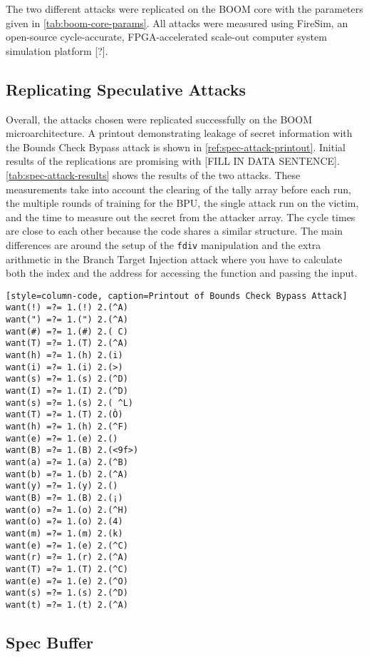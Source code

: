 The two different attacks were replicated on the BOOM core with the parameters given
in \ref{tab:boom-core-params}. All attacks were measured using FireSim, an open-source
cycle-accurate, FPGA-accelerated scale-out computer system simulation platform [?].

\subsection{Replicating Speculative Attacks}

Overall, the attacks chosen were replicated successfully on the BOOM microarchitecture. A printout
demonstrating leakage of secret information with the Bounds Check Bypass attack
is shown in \ref{ref:spec-attack-printout}. Initial results of the replications
are promising with [FILL IN DATA SENTENCE]. \ref{tab:spec-attack-results}
shows the results of the two attacks. These measurements take into account the clearing
of the tally array before each run, the multiple rounds of training for the BPU,
the single attack run on the victim, and the time to measure out the secret from the attacker array.
The cycle times are close to each other because the code shares a similar structure. The main
differences are around the setup of the {\tt fdiv} manipulation
and the extra arithmetic in the Branch Target Injection attack where you have to calculate
both the index and the address for accessing the function and passing the input. 

\begin{verbatim}[style=column-code, caption=Printout of Bounds Check Bypass Attack]
want(!) =?= 1.(!) 2.(^A)
want(") =?= 1.(") 2.(^A)
want(#) =?= 1.(#) 2.( C)
want(T) =?= 1.(T) 2.(^A)
want(h) =?= 1.(h) 2.(i)
want(i) =?= 1.(i) 2.(>)
want(s) =?= 1.(s) 2.(^D)
want(I) =?= 1.(I) 2.(^D)
want(s) =?= 1.(s) 2.( ^L)
want(T) =?= 1.(T) 2.(Ò)
want(h) =?= 1.(h) 2.(^F)
want(e) =?= 1.(e) 2.()
want(B) =?= 1.(B) 2.(<9f>)
want(a) =?= 1.(a) 2.(^B)
want(b) =?= 1.(b) 2.(^A)
want(y) =?= 1.(y) 2.()
want(B) =?= 1.(B) 2.(¡)
want(o) =?= 1.(o) 2.(^H)
want(o) =?= 1.(o) 2.(4)
want(m) =?= 1.(m) 2.(k)
want(e) =?= 1.(e) 2.(^C)
want(r) =?= 1.(r) 2.(^A)
want(T) =?= 1.(T) 2.(^C)
want(e) =?= 1.(e) 2.(^O)
want(s) =?= 1.(s) 2.(^D)
want(t) =?= 1.(t) 2.(^A)
\end{verbatim}\label{ref:spec-attack-printout}

\subsection{Spec Buffer}
